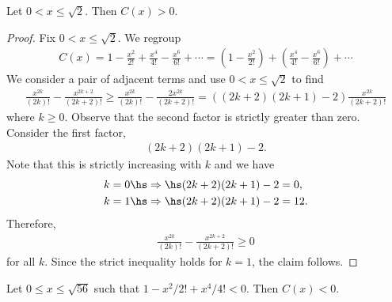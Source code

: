 \documentclass{article}
\begin{document}
\begin{claim*}
   Let $0<x\leq \sqrt{2}$. Then $C(x)>0$. 
\end{claim*}
\begin{proof}
   Fix $0<x\leq\sqrt{2}$. We regroup 
   \begin{align*}
      C(x) = 1 - \frac{x^2}{2!} + \frac{x^4}{4!} - \frac{x^6}{6!} + \cdots
      = \left(1 - \frac{x^2}{2!}\right) + \left(\frac{x^4}{4!} - \frac{x^6}{6!}\right) + \cdots
   \end{align*}
   We consider a pair of adjacent terms and use $0<x\leq\sqrt{2}$ to find 
   \begin{align*}
      \frac{x^{2k}}{(2k)!} - \frac{x^{2k+2}}{(2k+2)!}
      \geq \frac{x^{2k}}{(2k)!}-\frac{2x^{2k}}{(2k+2)!}
      = ((2k+2)(2k+1)-2)\frac{x^{2k}}{(2k+2)!}
   \end{align*}
   where $k\geq 0$.
   Observe that the second factor is strictly greater than zero. Consider the first factor,
   \begin{align*}
      (2k+2)(2k+1) - 2.
   \end{align*}
   Note that this is strictly increasing with $k$ and we have 
   \begin{align*}
      k=0 \hs&\Rightarrow\hs (2k+2)(2k+1) - 2 = 0,\\ 
      k=1 \hs&\Rightarrow\hs (2k+2)(2k+1) - 2 = 12.\\ 
   \end{align*}
   Therefore, 
   \begin{align*}
      \frac{x^{2k}}{(2k)!} - \frac{x^{2k+2}}{(2k+2)!} \geq 0
   \end{align*}
   for all $k$. Since the strict inequality holds for $k=1$, the claim follows.
\end{proof}
\begin{claim*}
   Let $0\leq x\leq \sqrt{56}$ such that $1-x^2/2!+x^4/4!<0$. Then $C(x)<0$.
\end{claim*}
\end{document}
